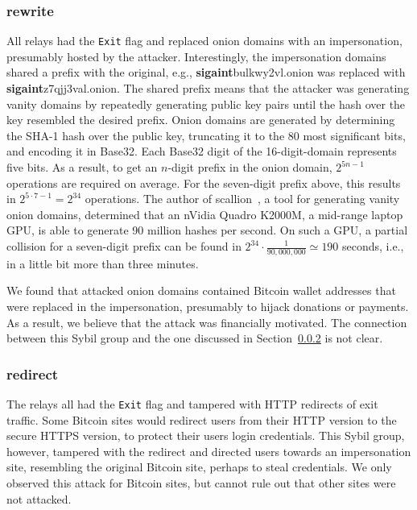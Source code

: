 \subsubsection{rewrite}
\label{sec:rewrite-sybils}
All relays had the \texttt{Exit} flag and replaced onion domains with an
impersonation, presumably hosted by the attacker.  Interestingly, the
impersonation domains shared a prefix with the original, e.g.,
\textbf{sigaint}bulkwy2vl.onion was replaced with
\textbf{sigaint}z7qjj3val.onion.  The shared prefix means that the attacker was
generating vanity domains by repeatedly generating public key pairs until the
hash over the key resembled the desired prefix.  Onion domains are generated by
determining the SHA-1 hash over the public key, truncating it to the 80 most
significant bits, and encoding it in Base32.  Each Base32 digit of the
16-digit-domain represents five bits.  As a result, to get an $n$-digit prefix
in the onion domain, $2^{5 n - 1}$ operations are required on average.  For the
seven-digit prefix above, this results in $2^{5 \cdot 7 - 1} = 2^{34}$
operations.  The author of scallion~\cite{scallion}, a tool for generating
vanity onion domains, determined that an nVidia Quadro K2000M, a mid-range
laptop GPU, is able to generate 90 million hashes per second.  On such a GPU, a
partial collision for a seven-digit prefix can be found in $2^{34} \cdot
\frac{1}{90,000,000} \simeq 190$ seconds, i.e., in a little bit more than three
minutes.

We found that attacked onion domains contained Bitcoin wallet addresses that
were replaced in the impersonation, presumably to hijack donations or payments.
As a result, we believe that the attack was financially motivated.  The
connection between this Sybil group and the one discussed in
Section~\ref{sec:redirect-sybils} is not clear.

\subsubsection{redirect}
\label{sec:redirect-sybils}
The relays all had the \texttt{Exit} flag and tampered with HTTP redirects of
exit traffic.  Some Bitcoin sites would redirect users from their HTTP version
to the secure HTTPS version, to protect their users login credentials.  This
Sybil group, however, tampered with the redirect and directed users towards an
impersonation site, resembling the original Bitcoin site, perhaps to steal
credentials.  We only observed this attack for Bitcoin sites, but cannot rule
out that other sites were not attacked.

